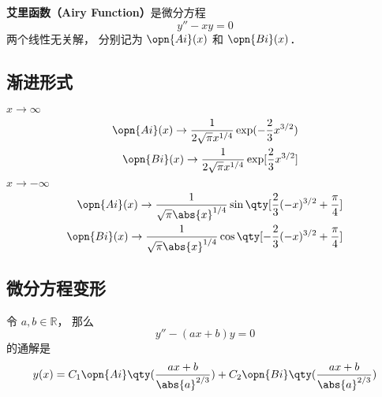 
\begin{issues}
\issueDraft
\end{issues}

\textbf{艾里函数（Airy Function）}是微分方程
\begin{equation}
y'' - xy = 0
\end{equation}
两个线性无关解， 分别记为 $\opn{Ai}(x)$ 和 $\opn{Bi}(x)$．

\subsection{渐进形式}
$x \to \infty$
\begin{align}
\opn{Ai}(x) \to \frac{1}{2\sqrt{\pi} x^{1/4}} \exp(-\frac{2}{3}x^{3/2})\\
\opn{Bi}(x) \to \frac{1}{2\sqrt{\pi} x^{1/4}} \exp[\frac{2}{3}x^{3/2}]
\end{align}
$x \to -\infty$
\begin{align}
\opn{Ai}(x) \to \frac{1}{\sqrt{\pi} \abs{x}^{1/4}} \sin\qty[\frac{2}{3}(-x)^{3/2}+\frac{\pi}{4}]\\
\opn{Bi}(x) \to \frac{1}{\sqrt{\pi} \abs{x}^{1/4}} \cos\qty[-\frac{2}{3}(-x)^{3/2}+\frac{\pi}{4}]
\end{align}

\subsection{微分方程变形}
令 $a, b\in \mathbb R$， 那么
\begin{equation}
y'' - (ax + b) y = 0
\end{equation}
的通解是
\begin{equation}\label{AiryF_eq1}
y(x) = C_1\opn{Ai}\qty(\frac{ax+b}{\abs{a}^{2/3}}) + C_2 \opn{Bi}\qty(\frac{ax+b}{\abs{a}^{2/3}})
\end{equation}
